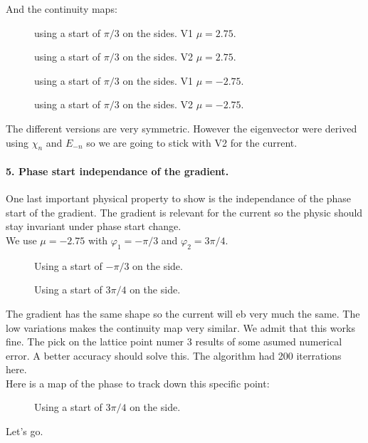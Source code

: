 \documentclass[../main.tex]{subfiles}
\begin{document}
And the continuity maps:
\begin{figure}[H]
    \centering
    
    \caption{using a start of $\pi/3$ on the sides. V1 $\mu = 2.75$.}
\end{figure}
\begin{figure}[H]
    \centering
    
    \caption{using a start of $\pi/3$ on the sides. V2 $\mu = 2.75$.}
\end{figure}

\begin{figure}[H]
    \centering
    
    \caption{using a start of $\pi/3$ on the sides. V1 $\mu = -2.75$.}
\end{figure}
\begin{figure}[H]
    \centering
    
    \caption{using a start of $\pi/3$ on the sides. V2 $\mu = -2.75$.}
\end{figure}

The different versions are very symmetric. However the eigenvector were derived using $\chi_n$ and $E_{-n}$ so we are going to stick with V2 for the current. 

\paragraph{5. Phase start independance of the gradient.}$~$\\
One last important physical property to show is the independance of the phase start of the gradient. The gradient is relevant for the current so the physic 
should stay invariant under phase start change.\\

We use $\mu = -2.75$ with $\varphi_1 = -\pi/3$ and $\varphi_2 = 3\pi/4$.
\begin{figure}[H]
    \centering
    
    \caption{Using a start of $-\pi/3$ on the side.}
\end{figure}
\begin{figure}[H]
    \centering
    
    \caption{Using a start of $3\pi/4$ on the side.}
\end{figure}
The gradient has the same shape so the current will eb very much the same. The low variations makes the 
continuity map very similar. We admit that this works fine. The pick on the lattice point numer 3 results 
of some asumed numerical error. A better accuracy should solve this. The algorithm had 200 iterrations here.\\ 

Here is a map of the phase to track down this specific point:
\begin{figure}[H]
    \centering
    
    \caption{Using a start of $3\pi/4$ on the side.}
\end{figure}

Let's go.
\end{document}
